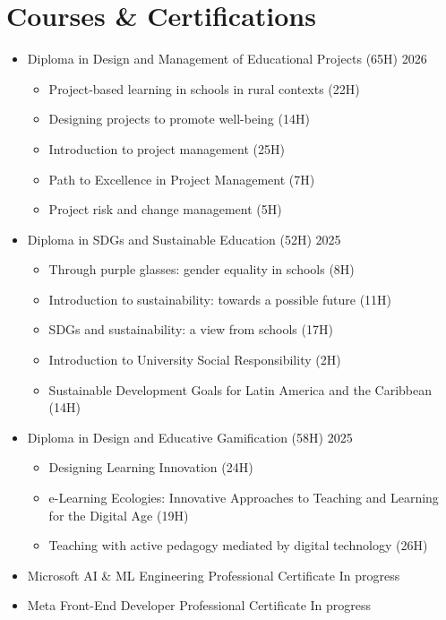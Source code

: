 \documentclass[11pt,a4paper]{article}
\begin{document}
\section*{Courses \& Certifications}
\begin{itemize}
    \item Diploma in Design and Management of Educational Projects (65H) \hfill 2026
    \begin{itemize}
        \item Project-based learning in schools in rural contexts (22H)
        \item Designing projects to promote well-being (14H)
        \item Introduction to project management (25H)
        \item Path to Excellence in Project Management (7H)
        \item Project risk and change management (5H)
    \end{itemize}
    \item Diploma in SDGs and Sustainable Education (52H) \hfill 2025
    \begin{itemize}
        \item Through purple glasses: gender equality in schools (8H)
        \item Introduction to sustainability: towards a possible future (11H)
        \item SDGs and sustainability: a view from schools (17H)
        \item Introduction to University Social Responsibility (2H)
        \item Sustainable Development Goals for Latin America and the Caribbean (14H)
    \end{itemize}
    \item Diploma in Design and Educative Gamification (58H) \hfill 2025
    \begin{itemize}
        \item Designing Learning Innovation (24H)
        \item e-Learning Ecologies: Innovative Approaches to Teaching and Learning for the Digital Age (19H)
        \item Teaching with active pedagogy mediated by digital technology (26H)
    \end{itemize}
    \item Microsoft AI \& ML Engineering Professional Certificate \hfill In progress
    \item Meta Front-End Developer Professional Certificate \hfill In progress

\end{itemize}
\end{document}
